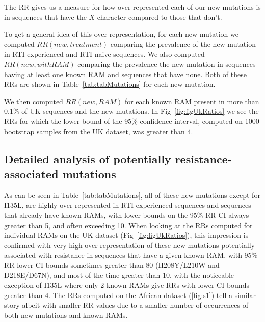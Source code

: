 \documentclass[
  11pt,
  twoside,
  BCOR=10mm,
  listof=totoc]{scrbook}
\begin{document}
The RR gives us a measure for how over-represented each of our new
mutations is in sequences that have the \(X\) character compared to those
that don't.

To get a general idea of this over-representation, for each new mutation
we computed \(RR(new, treatment)\) comparing the prevalence of the new
mutation in RTI-experienced and RTI-naive sequences. We also computed
\(RR(new, with RAM)\) comparing the prevalence the new mutation in
sequences having at least one known RAM and sequences that have none.
Both of these RRs are shown in
Table~\ref{tab:tabMutations}
for each new mutation.

We then computed \(RR(new, RAM)\) for each known RAM present in more than
0.1\% of UK sequences and the new mutations. In
Fig~\ref{fig:figUkRatios} we
see the RRs for which the lower bound of the 95\% confidence interval,
computed on 1000 bootstrap samples from the UK dataset, was greater than 4.

\hypertarget{detailed-analysis-of-potentially-resistance-associated-mutations}{%
\subsection{Detailed analysis of potentially resistance-associated mutations}\label{detailed-analysis-of-potentially-resistance-associated-mutations}}

As can be seen in Table~\ref{tab:tabMutations}, all of these new mutations except for I135L,
are highly over-represented in RTI-experienced sequences and sequences
that already have known RAMs, with lower bounds on the 95\% RR CI always
greater than 5, and often exceeding 10. When looking at the RRs computed
for individual RAMs on the UK dataset
(Fig~\ref{fig:figUkRatios}),
this impression is confirmed with very high over-representation of these
new mutations potentially associated with resistance in sequences that
have a given known RAM, with 95\% RR lower CI bounds sometimes greater
than 80 (H208Y/L210W and D218E/D67N), and most of the time greater than 10. with the noticeable exception of I135L where only 2 known RAMs give
RRs with lower CI bounds greater than 4. The RRs computed on the African
dataset (\ref{fig:s1}) tell a similar story albeit with smaller RR values due to a
smaller number of occurrences of both new mutations and known RAMs.
\end{document}
